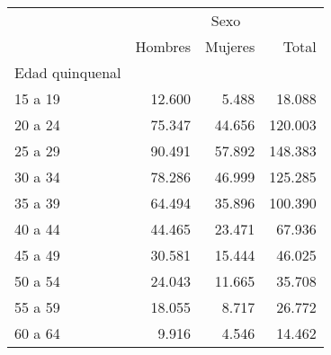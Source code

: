 \begin{tabular}{llll}
\cline{1-4}
\multicolumn{1}{c}{} &
  \multicolumn{3}{|c}{Sexo} \\
\multicolumn{1}{c}{} &
  \multicolumn{1}{|r}{Hombres} &
  \multicolumn{1}{r}{Mujeres} &
  \multicolumn{1}{r}{Total} \\
\cline{1-4}
\multicolumn{1}{l}{Edad quinquenal} &
  \multicolumn{1}{|r}{} &
  \multicolumn{1}{r}{} &
  \multicolumn{1}{r}{} \\
\multicolumn{1}{l}{\hspace{1em}15 a 19} &
  \multicolumn{1}{|r}{12.600} &
  \multicolumn{1}{r}{5.488} &
  \multicolumn{1}{r}{18.088} \\
\multicolumn{1}{l}{\hspace{1em}20 a 24} &
  \multicolumn{1}{|r}{75.347} &
  \multicolumn{1}{r}{44.656} &
  \multicolumn{1}{r}{120.003} \\
\multicolumn{1}{l}{\hspace{1em}25 a 29} &
  \multicolumn{1}{|r}{90.491} &
  \multicolumn{1}{r}{57.892} &
  \multicolumn{1}{r}{148.383} \\
\multicolumn{1}{l}{\hspace{1em}30 a 34} &
  \multicolumn{1}{|r}{78.286} &
  \multicolumn{1}{r}{46.999} &
  \multicolumn{1}{r}{125.285} \\
\multicolumn{1}{l}{\hspace{1em}35 a 39} &
  \multicolumn{1}{|r}{64.494} &
  \multicolumn{1}{r}{35.896} &
  \multicolumn{1}{r}{100.390} \\
\multicolumn{1}{l}{\hspace{1em}40 a 44} &
  \multicolumn{1}{|r}{44.465} &
  \multicolumn{1}{r}{23.471} &
  \multicolumn{1}{r}{67.936} \\
\multicolumn{1}{l}{\hspace{1em}45 a 49} &
  \multicolumn{1}{|r}{30.581} &
  \multicolumn{1}{r}{15.444} &
  \multicolumn{1}{r}{46.025} \\
\multicolumn{1}{l}{\hspace{1em}50 a 54} &
  \multicolumn{1}{|r}{24.043} &
  \multicolumn{1}{r}{11.665} &
  \multicolumn{1}{r}{35.708} \\
\multicolumn{1}{l}{\hspace{1em}55 a 59} &
  \multicolumn{1}{|r}{18.055} &
  \multicolumn{1}{r}{8.717} &
  \multicolumn{1}{r}{26.772} \\
\multicolumn{1}{l}{\hspace{1em}60 a 64} &
  \multicolumn{1}{|r}{9.916} &
  \multicolumn{1}{r}{4.546} &
  \multicolumn{1}{r}{14.462} \\

\end{tabular}
